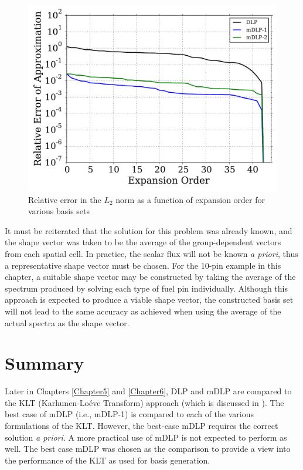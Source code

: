 \begin{figure}[bt]
    \centering
    \includegraphics[trim=.1cm .25cm .1cm .32cm, clip=true,
    totalheight=0.35\textheight]{Figures/error_plot_f}
    \caption{Relative error in the $L_2$ norm as a function of expansion order 
for 
various basis 
        sets}
    \label{fig:mDLP expansion}
\end{figure}

It must be reiterated that the solution for this problem was already known, and 
the shape 
vector was taken to be the average of the group-dependent vectors from each 
spatial cell.  In practice, the scalar flux will not be known {\it a priori}, 
thus a representative 
shape vector must be chosen.  For the 10-pin example in this chapter, 
a suitable shape vector may be constructed by taking the average of the spectrum 
produced by solving each type of fuel pin individually.  Although this 
approach is expected to produce a viable shape vector, the constructed 
basis set will not lead to the same accuracy as achieved when using the average 
of the actual spectra as the shape vector.

\section{Summary}

Later in Chapters \ref{Chapter5} and \ref{Chapter6}, DLP and mDLP are compared 
to the KLT (Karhunen-Lo\'{e}ve Transform) approach (which is discussed in 
).  The best case of mDLP (i.e., mDLP-1) is compared to 
each of the various formulations of the KLT.  However, the best-case mDLP 
requires the correct solution {\it a priori}.  A more practical 
use of 
mDLP is not expected to perform as well.  The best case mDLP was chosen as the 
comparison to provide a view into the performance of the KLT as used for basis 
generation.